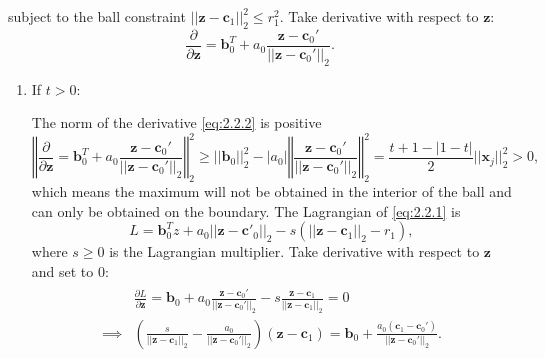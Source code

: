 subject to the ball constraint $||\boldsymbol z-\boldsymbol c_1||_2^2\leq r_1^2$.
Take derivative with respect to $\boldsymbol z$:
\begin{equation}
    \label{eq:2.2.2}
    \frac{\partial}{\partial\boldsymbol z}=\boldsymbol b_0^T+a_0\frac{\boldsymbol z-\boldsymbol c_0'}{||\boldsymbol z-\boldsymbol c_0'||_2}.
\end{equation}
\begin{enumerate}
    \item If $t>0$:
    
    The norm of the derivative \eqref{eq:2.2.2} is positive
    \begin{equation}
        \left\Vert\frac{\partial}{\partial\boldsymbol z}=\boldsymbol b_0^T+a_0\frac{\boldsymbol z-\boldsymbol c_0'}{||\boldsymbol z-\boldsymbol c_0'||_2}\right\Vert_2^2\geq ||\boldsymbol b_0||_2^2-|a_0|\left\Vert\frac{\boldsymbol z-\boldsymbol c_0'}{||\boldsymbol z-\boldsymbol c_0'||_2}\right\Vert_2^2=\frac{t+1-|1-t|}{2}||\boldsymbol x_j||_2^2>0,
    \end{equation}
    which means the maximum will not be obtained in the interior of the ball and can only be obtained on the boundary. The Lagrangian of \eqref{eq:2.2.1} is
    \begin{equation}
        L=\boldsymbol b_0^Tz+a_0||\boldsymbol z-\boldsymbol c'_0||_2-s(||\boldsymbol z-\boldsymbol c_1||_2-r_1),
    \end{equation}
    where $s\geq0$ is the Lagrangian multiplier. Take derivative with respect to $\boldsymbol z$ and set to 0:
    \begin{gather}
        \begin{aligned}
            &\frac{\partial L}{\partial \boldsymbol z}=\boldsymbol b_0+a_0\frac{\boldsymbol z-\boldsymbol c_0'}{||\boldsymbol z-\boldsymbol c_0'||_2}-s\frac{\boldsymbol z-\boldsymbol c_1}{||\boldsymbol z-\boldsymbol c_1||_2}=0\\
            \implies &\left(\frac{s}{||\boldsymbol z-\boldsymbol c_1||_2}-\frac{a_0}{||\boldsymbol z-\boldsymbol c_0'||_2}\right)(\boldsymbol z-\boldsymbol c_1)=\boldsymbol b_0+\frac{a_0(\boldsymbol c_1-\boldsymbol c_0')}{||\boldsymbol z- \boldsymbol c_0'||_2}.
        \end{aligned}
    \end{gather}
    

\end{enumerate}
